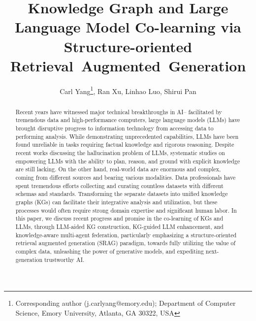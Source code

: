 \documentclass[]{article}
\begin{document}
\title{Knowledge Graph and Large Language Model Co-learning via Structure-oriented \mbox{Retrieval Augmented Generation}}

\author{Carl Yang\thanks{Corresponding author (j.carlyang@emory.edu); Department of Computer Science, Emory University, Atlanta, GA 30322, USA}, Ran Xu, Linhao Luo, Shirui Pan}

\maketitle

\begin{abstract}
Recent years have witnessed major technical breakthroughs in AI-- facilitated by tremendous data and high-performance computers, large language models (LLMs) have brought disruptive progress to information technology from accessing data to performing analysis. While demonstrating unprecedented capabilities, LLMs have been found unreliable in tasks requiring factual knowledge and rigorous reasoning. Despite recent works discussing the hallucination problem of LLMs, systematic studies on empowering LLMs with the ability to plan, reason, and ground with explicit knowledge are still lacking. 
On the other hand, real-world data are enormous and complex, coming from different sources and bearing various modalities. Data professionals have spent tremendous efforts collecting and curating countless datasets with different schemas and standards. Transforming the separate datasets into unified knowledge graphs (KGs) can facilitate their integrative analysis and utilization, but these processes would often require strong domain expertise and significant human labor. 
{In this paper, we discuss recent progress and promise in the co-learning of KGs and LLMs, through LLM-aided KG construction, KG-guided LLM enhancement, and knowledge-aware multi-agent federation, particularly emphasizing a structure-oriented retrieval augmented generation (SRAG) paradigm, towards fully utilizing the value of complex data, unleashing the power of generative models, and expediting next-generation trustworthy AI.} 
\end{abstract}







\end{document}
